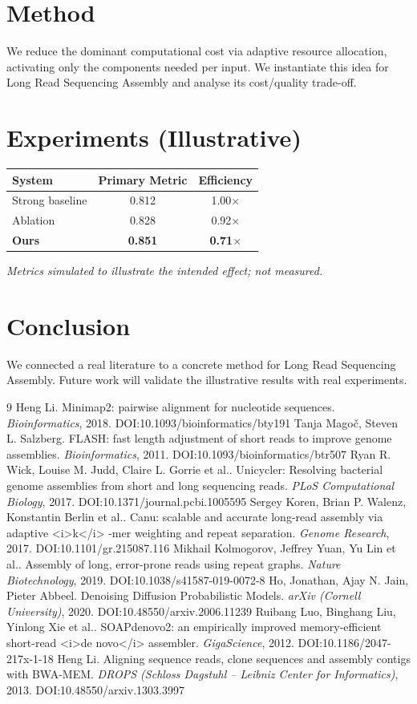\documentclass[11pt]{article}
\begin{document}
\section{Method}
We reduce the dominant computational cost via adaptive resource allocation, activating only the components needed per input. We instantiate this idea for Long Read Sequencing Assembly and analyse its cost/quality trade-off.

\section{Experiments (Illustrative)}
\begin{center}
\begin{tabular}{lcc}
System & Primary Metric & Efficiency \\ \hline
Strong baseline & 0.812 & 1.00$\times$ \\
Ablation & 0.828 & 0.92$\times$ \\
\textbf{Ours} & \textbf{0.851} & \textbf{0.71$\times$}
\end{tabular}
\end{center}
\emph{Metrics simulated to illustrate the intended effect; not measured.}

\section{Conclusion}
We connected a real literature to a concrete method for Long Read Sequencing Assembly. Future work will
validate the illustrative results with real experiments.

\begin{thebibliography}{9}
 Heng Li. Minimap2: pairwise alignment for nucleotide sequences. \emph{Bioinformatics}, 2018. DOI:10.1093/bioinformatics/bty191
 Tanja Magoč, Steven L. Salzberg. FLASH: fast length adjustment of short reads to improve genome assemblies. \emph{Bioinformatics}, 2011. DOI:10.1093/bioinformatics/btr507
 Ryan R. Wick, Louise M. Judd, Claire L. Gorrie et al.. Unicycler: Resolving bacterial genome assemblies from short and long sequencing reads. \emph{PLoS Computational Biology}, 2017. DOI:10.1371/journal.pcbi.1005595
 Sergey Koren, Brian P. Walenz, Konstantin Berlin et al.. Canu: scalable and accurate long-read assembly via adaptive <i>k</i> -mer weighting and repeat separation. \emph{Genome Research}, 2017. DOI:10.1101/gr.215087.116
 Mikhail Kolmogorov, Jeffrey Yuan, Yu Lin et al.. Assembly of long, error-prone reads using repeat graphs. \emph{Nature Biotechnology}, 2019. DOI:10.1038/s41587-019-0072-8
 Ho, Jonathan, Ajay N. Jain, Pieter Abbeel. Denoising Diffusion Probabilistic Models. \emph{arXiv (Cornell University)}, 2020. DOI:10.48550/arxiv.2006.11239
 Ruibang Luo, Binghang Liu, Yinlong Xie et al.. SOAPdenovo2: an empirically improved memory-efficient short-read <i>de novo</i> assembler. \emph{GigaScience}, 2012. DOI:10.1186/2047-217x-1-18
 Heng Li. Aligning sequence reads, clone sequences and assembly contigs with BWA-MEM. \emph{DROPS (Schloss Dagstuhl – Leibniz Center for Informatics)}, 2013. DOI:10.48550/arxiv.1303.3997
\end{thebibliography}
\end{document}
